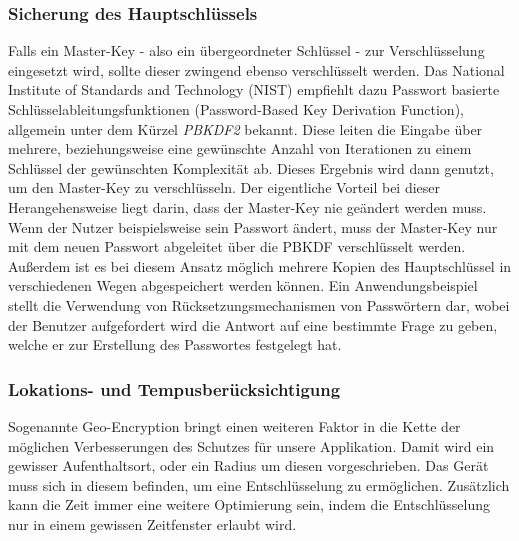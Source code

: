 		\subsubsection{Sicherung des Hauptschlüssels}\label{sec:master-key}		
			Falls ein Master-Key - also ein übergeordneter Schlüssel - zur
			Verschlüsselung eingesetzt wird, sollte dieser zwingend ebenso verschlüsselt
			werden. Das National Institute of Standards and Technology (NIST)
			empfiehlt\cite{NISTPBKDF2010} dazu Passwort basierte 
			Schlüsselableitungsfunktionen (Password-Based Key Derivation Function),
			allgemein unter dem Kürzel \textsl{PBKDF2} bekannt.
			Diese leiten die Eingabe über mehrere, beziehungsweise eine gewünschte Anzahl
			von Iterationen zu einem Schlüssel der gewünschten Komplexität ab. Dieses
			Ergebnis wird dann genutzt, um den Master-Key zu verschlüsseln. Der
			eigentliche Vorteil bei dieser Herangehensweise liegt darin, dass der
			Master-Key nie geändert werden muss. Wenn der Nutzer beispielsweise sein
			Passwort ändert, muss der Master-Key nur mit dem neuen Passwort abgeleitet
			über die PBKDF verschlüsselt werden. Außerdem ist es bei diesem Ansatz
			möglich mehrere Kopien des Hauptschlüssel in verschiedenen Wegen
			abgespeichert werden können. Ein Anwendungsbeispiel stellt die
			Verwendung von Rücksetzungsmechanismen von Passwörtern dar, wobei der
			Benutzer aufgefordert wird die Antwort auf eine bestimmte Frage zu geben,
			welche er zur Erstellung des Passwortes festgelegt hat.
		\subsubsection{Lokations- und Tempusberücksichtigung}
			Sogenannte Geo-Encryption bringt einen weiteren Faktor in die Kette der
			möglichen Verbesserungen des Schutzes für unsere Applikation. Damit wird
			ein gewisser Aufenthaltsort, oder ein Radius um diesen vorgeschrieben. Das
			Gerät muss sich in diesem befinden, um eine Entschlüsselung zu ermöglichen.
			Zusätzlich kann die Zeit immer eine weitere Optimierung sein, indem die
			Entschlüsselung nur in einem gewissen Zeitfenster erlaubt wird.
